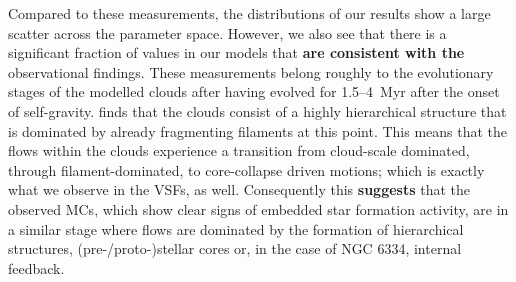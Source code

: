 Compared to these measurements, the distributions of our results show a large scatter across the parameter space. 
However, we also see that there is a significant fraction of values in our models that \textbf{are consistent with the} observational findings. 
These measurements belong roughly to the evolutionary stages of the modelled clouds after having evolved for 1.5--4~Myr after the onset of self-gravity.
 finds that the clouds consist of a highly hierarchical structure that is dominated by already fragmenting filaments at this point.
This means that the flows within the clouds experience a transition from cloud-scale dominated, through filament-dominated, to core-collapse driven motions; which is exactly what we observe in the VSFs, as well.
Consequently this \textbf{suggests} that the observed MCs, which show clear signs of embedded star formation activity, are in a similar stage where flows are dominated by the formation of hierarchical structures, (pre-/proto-)stellar cores or, in the case of NGC 6334, internal feedback.

